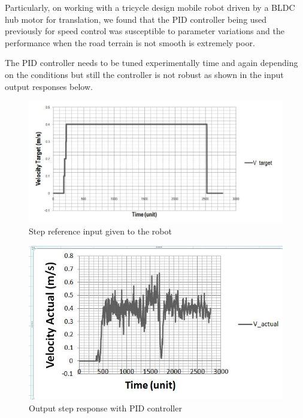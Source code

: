\documentclass[a4paper,12pt]{article}
\begin{document}
Particularly, on working with a tricycle design mobile robot driven by a BLDC hub motor for translation, we found that the PID controller being used previously for speed control was susceptible to parameter variations and the performance when the road terrain is not smooth is extremely poor. 

The PID controller needs to be tuned experimentally time and again depending on the conditions but still the controller is not robust as shown in the input output responses below. 	\begin{figure}[H]
 
			  \centering
			  
			  \includegraphics[scale=0.6]{step}
			  \caption{Step reference input given to the robot}
			 \label{step}
		\end{figure}	\begin{figure}[H]
 
			  \centering
			  
			  \includegraphics[scale=0.75]{step_out}
			  \caption{Output step response with PID controller}
			 \label{step_out}
		\end{figure}
\end{document}

